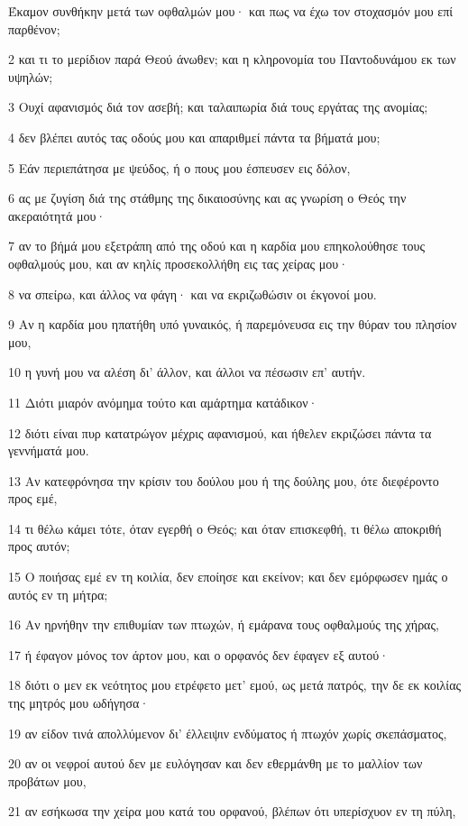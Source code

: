 \par Έκαμον συνθήκην μετά των οφθαλμών μου· και πως να έχω τον στοχασμόν μου επί παρθένον;
\par 2 και τι το μερίδιον παρά Θεού άνωθεν; και η κληρονομία του Παντοδυνάμου εκ των υψηλών;
\par 3 Ουχί αφανισμός διά τον ασεβή; και ταλαιπωρία διά τους εργάτας της ανομίας;
\par 4 δεν βλέπει αυτός τας οδούς μου και απαριθμεί πάντα τα βήματά μου;
\par 5 Εάν περιεπάτησα με ψεύδος, ή ο πους μου έσπευσεν εις δόλον,
\par 6 ας με ζυγίση διά της στάθμης της δικαιοσύνης και ας γνωρίση ο Θεός την ακεραιότητά μου·
\par 7 αν το βήμά μου εξετράπη από της οδού και η καρδία μου επηκολούθησε τους οφθαλμούς μου, και αν κηλίς προσεκολλήθη εις τας χείρας μου·
\par 8 να σπείρω, και άλλος να φάγη· και να εκριζωθώσιν οι έκγονοί μου.
\par 9 Αν η καρδία μου ηπατήθη υπό γυναικός, ή παρεμόνευσα εις την θύραν του πλησίον μου,
\par 10 η γυνή μου να αλέση δι' άλλον, και άλλοι να πέσωσιν επ' αυτήν.
\par 11 Διότι μιαρόν ανόμημα τούτο και αμάρτημα κατάδικον·
\par 12 διότι είναι πυρ κατατρώγον μέχρις αφανισμού, και ήθελεν εκριζώσει πάντα τα γεννήματά μου.
\par 13 Αν κατεφρόνησα την κρίσιν του δούλου μου ή της δούλης μου, ότε διεφέροντο προς εμέ,
\par 14 τι θέλω κάμει τότε, όταν εγερθή ο Θεός; και όταν επισκεφθή, τι θέλω αποκριθή προς αυτόν;
\par 15 Ο ποιήσας εμέ εν τη κοιλία, δεν εποίησε και εκείνον; και δεν εμόρφωσεν ημάς ο αυτός εν τη μήτρα;
\par 16 Αν ηρνήθην την επιθυμίαν των πτωχών, ή εμάρανα τους οφθαλμούς της χήρας,
\par 17 ή έφαγον μόνος τον άρτον μου, και ο ορφανός δεν έφαγεν εξ αυτού·
\par 18 διότι ο μεν εκ νεότητος μου ετρέφετο μετ' εμού, ως μετά πατρός, την δε εκ κοιλίας της μητρός μου ωδήγησα·
\par 19 αν είδον τινά απολλύμενον δι' έλλειψιν ενδύματος ή πτωχόν χωρίς σκεπάσματος,
\par 20 αν οι νεφροί αυτού δεν με ευλόγησαν και δεν εθερμάνθη με το μαλλίον των προβάτων μου,
\par 21 αν εσήκωσα την χείρα μου κατά του ορφανού, βλέπων ότι υπερίσχυον εν τη πύλη,
